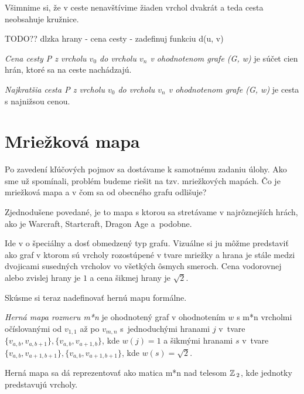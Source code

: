 Všimnime si, že v ceste nenavštívime žiaden vrchol dvakrát a teda cesta neobsahuje kružnice.

TODO?? dlzka hrany - cena cesty - zadefinuj funkciu d(u, v)

\begin{define}
{\sl Cena cesty P z vrcholu $v_0$ do vrcholu $v_n$ v ohodnotenom grafe (G, w) } je súčet cien hrán, ktoré sa na ceste nachádzajú.
\end{define}

\begin{define}
{\sl Najkratšia cesta P z vrcholu $v_0$ do vrcholu $v_n$
v ohodnotenom grafe (G, w)} 
je cesta s najnižsou cenou.
\end{define}





\section{Mriežková mapa}

Po zavedení kľúčových pojmov sa dostávame k samotnému zadaniu úlohy. 
Ako sme už spomínali, problém budeme riešit na tzv. mriežkových mapách. Čo je mriežková mapa a v čom sa od obecného grafu odlišuje?

Zjednodušene povedané, je to mapa s ktorou sa stretávame v najrôznejších hrách, ako je Warcraft, Startcraft, Dragon Age
a~podobne.

Ide v o špeciálny a dosť obmedzený typ grafu. Vizuálne si ju môžme predstaviť ako graf v ktorom sú vrcholy rozostúpené v tvare mriežky a hrana
je stále medzi dvojicami susedných vrcholov vo všetkých ôsmych smeroch. Cena vodorovnej alebo zvislej hrany je $1$ a cena šikmej hrany je $\sqrt{2}$.


Skúsme si teraz nadefinovať hernú mapu formálne.

\begin{define}
{\sl Herná mapa rozmeru m*n} je ohodnotený graf v ohodnotením $w$ s m*n vrcholmi očíslovanými od $v_{1,1}$ až po $v_{m,n}$ 
s~jednoduchými hranami $j$ v~tvare $\{v_{a,b}, v_{a,b+1}\}, \{v_{a,b}, v_{a+1,b}\}$, kde $w(j) = 1$ 
a šikmými hranami $ s $ v~tvare $\{v_{a,b}, v_{a+1,b+1}\}, \{v_{a,b}, v_{a+1,b+1}\}$, kde $ w(s) = \sqrt{2}$.
\end{define}

\begin{note}
	Herná mapa sa dá reprezentovať ako matica m*n nad telesom $\mathbb{Z}\,_2$, kde jednotky predstavujú vrcholy.
\end{note}

